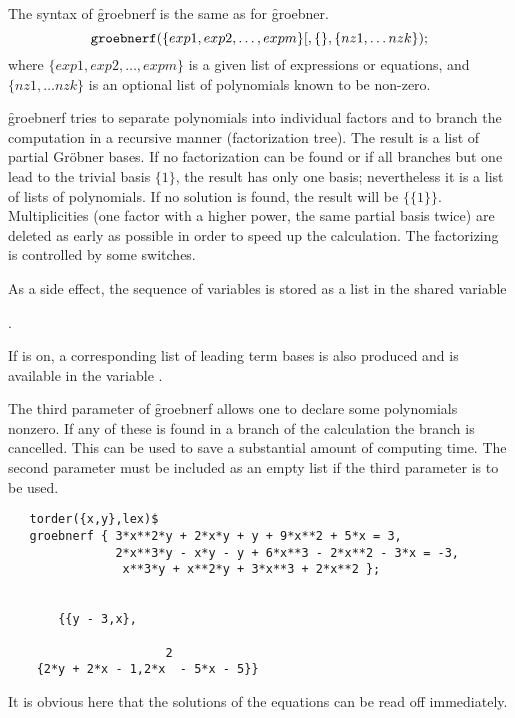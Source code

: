 
The syntax of \f{groebnerf} is the same as for \f{groebner}.
\[ \texttt{groebnerf}(\{exp1, exp2, \ldots , expm\}
         [,\{\},\{nz1, \ldots nzk\}); \]
where $\{exp1, exp2, \ldots , expm\} $ is a given list of expressions or
equations, and $\{nz1, \ldots nzk\}$ is
an optional list of polynomials known to be non-zero.

\f{groebnerf} tries to separate polynomials into individual factors and
to branch the computation in a recursive manner (factorization tree).
The result is a list of partial Gr\"obner bases. If no factorization can
be found or if all branches but one lead to the trivial basis $\{1\}$,
the result has only one basis; nevertheless it is a list of lists of
polynomials. If no solution is found, the result will be $\{\{1\}\}$.
Multiplicities (one factor with a higher power, the same partial basis
twice) are deleted as early as possible in order to speed up the
calculation. The factorizing is controlled by some switches.

As a side effect, the sequence of variables is stored as a \REDUCE list in
the shared variable
\begin{center}
 .
\end{center}
If  is on, a corresponding list of leading term bases is
also produced and is available in the variable .

The third parameter of \f{groebnerf} allows one to declare some polynomials
nonzero. If any of these is found in a branch of the calculation
the branch is cancelled. This can be used to save a substantial amount
of computing time. The second parameter must be included as an
empty list if the third parameter is to be used.

\begin{verbatim}
   torder({x,y},lex)$
   groebnerf { 3*x**2*y + 2*x*y + y + 9*x**2 + 5*x = 3,
               2*x**3*y - x*y - y + 6*x**3 - 2*x**2 - 3*x = -3,
                x**3*y + x**2*y + 3*x**3 + 2*x**2 };


       {{y - 3,x},

                      2
    {2*y + 2*x - 1,2*x  - 5*x - 5}}
\end{verbatim}
It is obvious here that the solutions of the equations can be read
off immediately.

